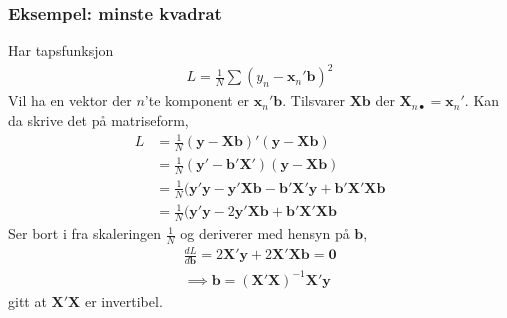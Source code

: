 \subsubsection{Eksempel: minste kvadrat}
Har tapsfunksjon
\begin{align}
L = \frac{1}{N}\sum (y_n-\mathbf{x}_n'\mathbf{b})^2
\end{align}
Vil ha en vektor der $n$'te komponent er $\mathbf{x}_n'\mathbf{b}$. Tilsvarer $\mathbf{X}\mathbf{b}$ der $\mathbf{X}_{n\bullet} = \mathbf{x}_n'$. Kan da skrive det på matriseform,
\begin{align}
L &= \frac{1}{N} (\mathbf{y}-\mathbf{X}\mathbf{b})'(\mathbf{y}-\mathbf{X}\mathbf{b}) \\
&=\frac{1}{N} (\mathbf{y}'-\mathbf{b}'\mathbf{X}')(\mathbf{y}-\mathbf{X}\mathbf{b}) \\
&=\frac{1}{N} (\mathbf{y}'\mathbf{y}-\mathbf{y}'\mathbf{X}\mathbf{b}-\mathbf{b}'\mathbf{X}'\mathbf{y} + \mathbf{b}'\mathbf{X}'\mathbf{X}\mathbf{b} \\
&= \frac{1}{N} (\mathbf{y}'\mathbf{y}-2\mathbf{y}'\mathbf{X}\mathbf{b} + \mathbf{b}'\mathbf{X}'\mathbf{X}\mathbf{b}
\end{align}
Ser bort i fra skaleringen $\frac{1}{N}$ og deriverer med hensyn på $\mathbf{b}$,
\begin{align}
\frac{d L}{d \mathbf{b}} = 2 \mathbf{X}'\mathbf{y} + 2\mathbf{X}'\mathbf{X}\mathbf{b} = \mathbf{0} \\
\implies \mathbf{b} = (\mathbf{X}'\mathbf{X})^{-1}\mathbf{X}'\mathbf{y}
\end{align}
gitt at $\mathbf{X}'\mathbf{X}$ er invertibel.
